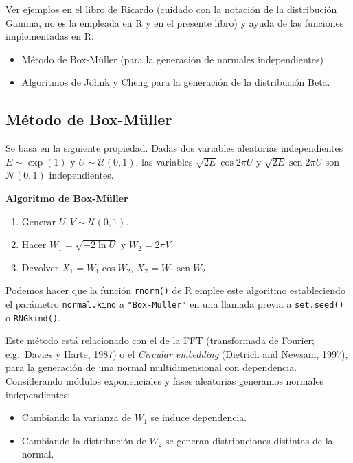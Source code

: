 \documentclass[
]{book}
\theoremstyle{break}
\theoremstyle{definition}
\theoremstyle{definition}
\theoremstyle{definition}
\theoremstyle{remark}
\begin{document}
Ver ejemplos en el libro de Ricardo (cuidado con la notación de la distribución Gamma, no es la empleada en R y en el presente libro) y ayuda de las funciones implementadas en R:

\begin{itemize}
\item
  Método de Box-Müller (para la generación de normales independientes)
\item
  Algoritmos de Jöhnk y Cheng para la generación de la distribución Beta.
\end{itemize}

\hypertarget{muxe9todo-de-box-muxfcller}{%
\subsection{Método de Box-Müller}\label{muxe9todo-de-box-muxfcller}}

Se basa en la siguiente propiedad. Dadas dos variables aleatorias independientes \(E \sim \exp\left( 1\right)\) y
\(U \sim \mathcal{U}( 0, 1 )\), las variables
\(\sqrt{2E} \cos 2\pi U\) y \(\sqrt{2E}\operatorname{sen} 2\pi U\) son
\(\mathcal{N}( 0, 1 )\) independientes.

\textbf{Algoritmo de Box-Müller}

\begin{enumerate}
\def\labelenumi{\arabic{enumi}.}
\item
  Generar \(U,V\sim \mathcal{U}( 0, 1 )\).
\item
  Hacer \(W_1=\sqrt{-2\ln U}\) y \(W_2=2\pi V\).
\item
  Devolver \(X_1=W_1\cos W_2\), \(X_2=W_1\operatorname{sen}W_2\).
\end{enumerate}

Podemos hacer que la función \texttt{rnorm()} de R emplee este algoritmo estableciendo el parámetro \texttt{normal.kind} a \texttt{"Box-Muller"} en una llamada previa a \texttt{set.seed()} o \texttt{RNGkind()}.

Este método está relacionado con el de la FFT (transformada de Fourier; e.g.~Davies y Harte, 1987) o el \emph{Circular embedding} (Dietrich and Newsam, 1997), para la generación de una normal multidimensional con dependencia.
Considerando módulos exponenciales y fases aleatorias generamos normales independientes:

\begin{itemize}
\item
  Cambiando la varianza de \(W_1\) se induce dependencia.
\item
  Cambiando la distribución de \(W_2\) se generan distribuciones distintas de la normal.
\end{itemize}
\end{document}
